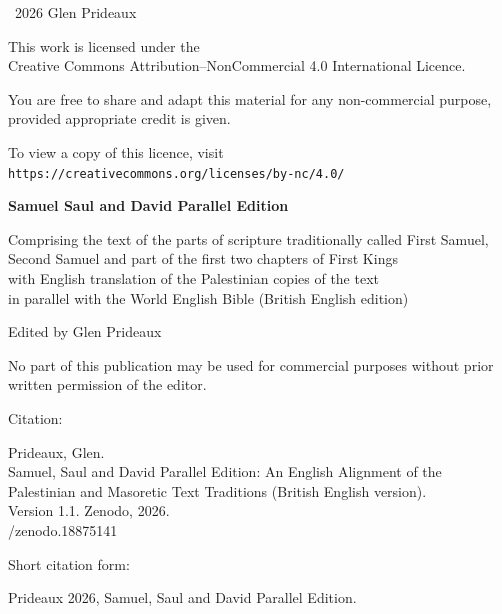 \clearpage
\thispagestyle{empty}
\vspace*{\fill}

\small
\textcopyright\ 2026 Glen Prideaux

\vspace{1em}

This work is licensed under the\\
Creative Commons Attribution–NonCommercial 4.0 International Licence.

\vspace{1em}

You are free to share and adapt this material for any non-commercial purpose,
provided appropriate credit is given.

\vspace{1em}

To view a copy of this licence, visit\\
\texttt{https://creativecommons.org/licenses/by-nc/4.0/}

\vspace{2em}

\textbf{Samuel Saul and David Parallel Edition}

Comprising the text of the parts of scripture traditionally called First
Samuel,\\
Second Samuel and part of the first two chapters of First Kings\\
with
English translation of the Palestinian copies of the text\\
in parallel
with the World English Bible (British English edition)

\vspace{1em}

Edited by Glen Prideaux

\vspace{2em}

No part of this publication may be used for commercial purposes
without prior written permission of the editor.

\vspace{2em}

{
\setlength{\parindent}{1cm}%
\noindent Citation:\par
\indent Prideaux, Glen.\\
\indent Samuel, Saul and David Parallel Edition: An English Alignment
of the Palestinian and Masoretic Text Traditions (British English version).\\
\indent Version 1.1. Zenodo, 2026.\\
/zenodo.18875141

\noindent Short citation form:\par
\indent Prideaux 2026, Samuel, Saul and David Parallel Edition.
}

